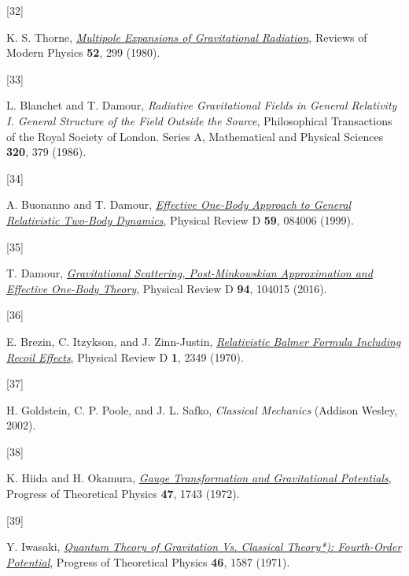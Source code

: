 \documentclass[
  10pt,
  a4paper,
  DIV=11,
  numbers=noendperiod,
  twoside]{scrreprt}
\newlength{\cslhangindent}
\newlength{\csllabelwidth}
\newlength{\cslentryspacingunit} %
\newenvironment{CSLReferences}[2] %
 {%
  \setlength{\parindent}{0pt}
  \ifodd #1
  \let\oldpar\par
  \def\par{\hangindent=\cslhangindent\oldpar}
  \fi
  \setlength{\parskip}{#2\cslentryspacingunit}
 }%
 {}
\newcommand{\CSLLeftMargin}[1]{\parbox[t]{\csllabelwidth}{#1}}
\newcommand{\CSLRightInline}[1]{\parbox[t]{\linewidth - \csllabelwidth}{#1}\break}
\DeclareRobustCommand{\[}{\begin{equation}}
\DeclareRobustCommand{\]}{\end{equation}}
\begin{document}
\begin{CSLReferences}{0}{0}
\leavevmode{}%
\CSLLeftMargin{{[}32{]} }%
\CSLRightInline{K. S. Thorne,
\emph{\href{https://doi.org/10.1103/RevModPhys.52.299}{Multipole
Expansions of Gravitational Radiation}}, Reviews of Modern Physics
\textbf{52}, 299 (1980).}

\leavevmode{}%
\CSLLeftMargin{{[}33{]} }%
\CSLRightInline{L. Blanchet and T. Damour, \emph{Radiative
{Gravitational Fields} in {General Relativity I}. {General Structure} of
the {Field} Outside the {Source}}, Philosophical Transactions of the
Royal Society of London. Series A, Mathematical and Physical Sciences
\textbf{320}, 379 (1986).}

\leavevmode{}%
\CSLLeftMargin{{[}34{]} }%
\CSLRightInline{A. Buonanno and T. Damour,
\emph{\href{https://doi.org/10.1103/PhysRevD.59.084006}{Effective
One-Body Approach to General Relativistic Two-Body Dynamics}}, Physical
Review D \textbf{59}, 084006 (1999).}

\leavevmode{}%
\CSLLeftMargin{{[}35{]} }%
\CSLRightInline{T. Damour,
\emph{\href{https://doi.org/10.1103/PhysRevD.94.104015}{Gravitational
Scattering, Post-{Minkowskian} Approximation and {Effective One-Body}
Theory}}, Physical Review D \textbf{94}, 104015 (2016).}

\leavevmode{}%
\CSLLeftMargin{{[}36{]} }%
\CSLRightInline{E. Brezin, C. Itzykson, and J. Zinn-Justin,
\emph{\href{https://doi.org/10.1103/PhysRevD.1.2349}{Relativistic
{Balmer Formula Including Recoil Effects}}}, Physical Review D
\textbf{1}, 2349 (1970).}

\leavevmode{}%
\CSLLeftMargin{{[}37{]} }%
\CSLRightInline{H. Goldstein, C. P. Poole, and J. L. Safko,
\emph{Classical {Mechanics}} ({Addison Wesley}, 2002).}

\leavevmode{}%
\CSLLeftMargin{{[}38{]} }%
\CSLRightInline{K. Hiida and H. Okamura,
\emph{\href{https://doi.org/10.1143/PTP.47.1743}{Gauge {Transformation}
and {Gravitational Potentials}}}, Progress of Theoretical Physics
\textbf{47}, 1743 (1972).}

\leavevmode{}%
\CSLLeftMargin{{[}39{]} }%
\CSLRightInline{Y. Iwasaki,
\emph{\href{https://doi.org/10.1143/PTP.46.1587}{Quantum {Theory} of
{Gravitation} Vs. {Classical Theory}*): {Fourth-Order Potential}}},
Progress of Theoretical Physics \textbf{46}, 1587 (1971).}


\end{CSLReferences}
\end{document}
